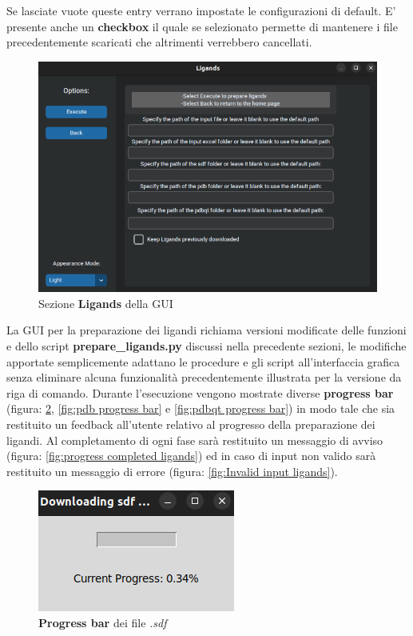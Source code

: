 Se lasciate vuote queste entry verrano impostate le configurazioni di default. E' presente anche un \textbf{checkbox} il quale se selezionato permette di mantenere i file precedentemente scaricati che altrimenti verrebbero cancellati.\newline

\begin{figure}[H]
    \centering
    \includegraphics[scale=0.6]{immagini/ligands.png}
    \caption{Sezione \textbf{Ligands} della GUI}
    \label{fig:ligands}
\end{figure}

La GUI per la preparazione dei ligandi richiama versioni modificate delle funzioni e dello script \textbf{prepare\_ligands.py} discussi nella precedente sezioni, le modifiche apportate semplicemente adattano le procedure e gli script all'interfaccia grafica senza eliminare alcuna funzionalità precedentemente illustrata per la versione da riga di comando.\newline
Durante l'esecuzione vengono mostrate diverse  \textbf{progress bar} (figura: \ref{fig:sdf progress bar}, \ref{fig:pdb progress bar} e \ref{fig:pdbqt progress bar}) in modo tale che sia restituito un feedback all'utente relativo al progresso della preparazione dei ligandi. Al completamento di ogni fase sarà restituito un messaggio di avviso (figura: \ref{fig:progress completed ligands}) ed in caso di input non valido sarà restituito un messaggio di errore (figura: \ref{fig:Invalid input ligands}).

\begin{figure}[H]
    \centering
    \includegraphics{immagini/sdfProgressBar.png}
    \caption{\textbf{Progress bar} dei file \textit{.sdf}}
    \label{fig:sdf progress bar}
\end{figure}

